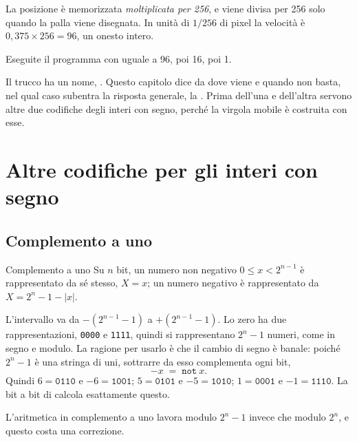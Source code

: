 La posizione è memorizzata \emph{moltiplicata per 256}, e viene divisa per 256
solo quando la palla viene disegnata. In unità di $1/256$ di pixel la velocità
è $0,375\times 256 = 96$, un onesto intero.

\begin{prgtry}
Eseguite il programma con  uguale a 96, poi 16, poi 1.
\end{prgtry}

Il trucco ha un nome, . Questo capitolo dice da dove viene
e quando non basta, nel qual caso subentra la risposta generale, la
. Prima dell'una e dell'altra servono altre due codifiche
degli interi con segno, perché la virgola mobile è costruita con esse.

\section{Altre codifiche per gli interi con segno}

\subsection{Complemento a uno}

\begin{definition}{Complemento a uno}
Su $n$ bit, un numero non negativo $0\le x<2^{n-1}$ è rappresentato da sé
stesso, $X=x$; un numero negativo è rappresentato da $X = 2^{n}-1-|x|$.
\end{definition}

L'intervallo va da $-(2^{n-1}-1)$ a $+(2^{n-1}-1)$. Lo zero ha due
rappresentazioni, \texttt{0000} e \texttt{1111}, quindi si rappresentano
$2^{n}-1$ numeri, come in segno e modulo. La ragione per usarlo è che il cambio
di segno è banale: poiché $2^{n}-1$ è una stringa di uni, sottrarre da esso
complementa ogni bit,
\[ -x \;=\; \mathtt{not}\ x. \]
Quindi $6=\texttt{0110}$ e $-6=\texttt{1001}$; $5=\texttt{0101}$ e
$-5=\texttt{1010}$; $1=\texttt{0001}$ e $-1=\texttt{1110}$. La  bit a
bit di \riscv calcola esattamente questo.

L'aritmetica in complemento a uno lavora modulo $2^{n}-1$ invece che modulo
$2^{n}$, e questo costa una correzione.

